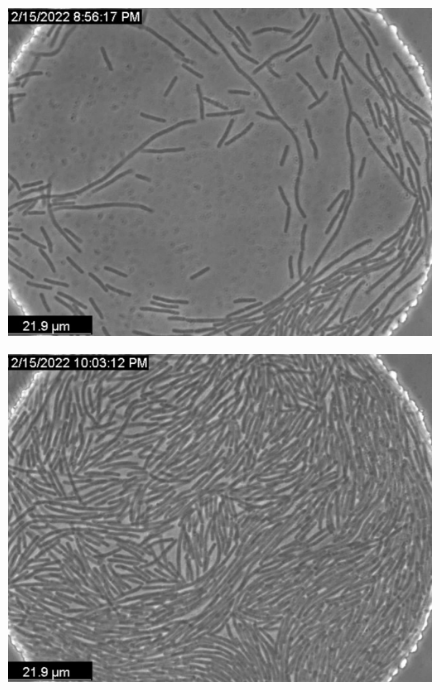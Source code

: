 \documentclass[a4paper,11pt,titlepage]{jsarticle}
\begin{document}
\begin{figure}[htbp]
  \centering
  \begin{minipage}{0.45\linewidth}
    \centering
    \includegraphics[width=\columnwidth]{Series015_t060000_RAW_ch00.pdf}
    \label{fig:06_1}
  \end{minipage}
  \begin{minipage}{0.45\linewidth}
    \centering
    \includegraphics[width=\columnwidth]{Series015_t100000_RAW_ch00.pdf}
    \label{fig:06_2}
  \end{minipage}
  \begin{minipage}{0.45\linewidth}

\end{minipage}
\end{figure}
\end{document}
